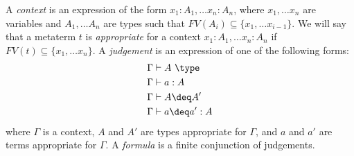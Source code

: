 A \emph{context} is an expression of the form $x_1 : A_1, \ldots x_n : A_n$, where $x_1, \ldots x_n$ are variables and $A_1, \ldots A_n$ are types such that $FV(A_i) \subseteq \{ x_1, \ldots x_{i-1} \}$.
We will say that a metaterm $t$ is \emph{appropriate} for a context $x_1 : A_1, \ldots x_n : A_n$ if $FV(t) \subseteq \{ x_1, \ldots x_n \}$.
A \emph{judgement} is an expression of one of the following forms:
\begin{align*}
\Gamma & \vdash A\ \type \\
\Gamma & \vdash a : A \\
\Gamma & \vdash A \deq A' \\
\Gamma & \vdash a \deq a' : A
\end{align*}
where $\Gamma$ is a context, $A$ and $A'$ are types appropriate for $\Gamma$, and $a$ and $a'$ are terms appropriate for $\Gamma$.
A \emph{formula} is a finite conjunction of judgements.
